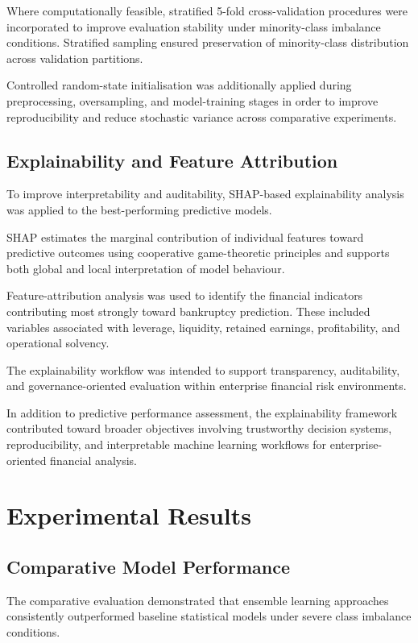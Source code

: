\documentclass{article}
\begin{document}
Where computationally feasible, stratified 5-fold cross-validation procedures were incorporated to improve evaluation stability under minority-class imbalance conditions. Stratified sampling ensured preservation of minority-class distribution across validation partitions.

Controlled random-state initialisation was additionally applied during preprocessing, oversampling, and model-training stages in order to improve reproducibility and reduce stochastic variance across comparative experiments.

\subsection{Explainability and Feature Attribution}

To improve interpretability and auditability, SHAP-based explainability analysis \cite{lundberg2017unified} was applied to the best-performing predictive models.

SHAP estimates the marginal contribution of individual features toward predictive outcomes using cooperative game-theoretic principles and supports both global and local interpretation of model behaviour.

Feature-attribution analysis was used to identify the financial indicators contributing most strongly toward bankruptcy prediction. These included variables associated with leverage, liquidity, retained earnings, profitability, and operational solvency.

The explainability workflow was intended to support transparency, auditability, and governance-oriented evaluation within enterprise financial risk environments.

In addition to predictive performance assessment, the explainability framework contributed toward broader objectives involving trustworthy decision systems, reproducibility, and interpretable machine learning workflows for enterprise-oriented financial analysis.

\section{Experimental Results}

\subsection{Comparative Model Performance}

The comparative evaluation demonstrated that ensemble learning approaches consistently outperformed baseline statistical models under severe class imbalance conditions.
\end{document}
